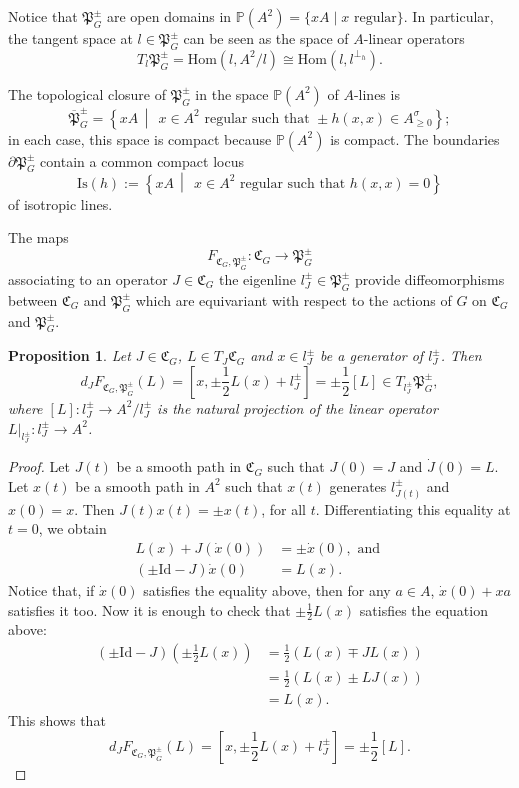 \documentclass[oneside,11pt]{amsart}
\newtheorem{prop}[thm]{Proposition}
\theoremstyle{definition}
\theoremstyle{remark}
\newcommand{\midwd}{\,\middle\vert\,}
\numberwithin{thm}{section}
\numberwithin{equation}{section}
\begin{document}
Notice that $\mathfrak{P}_G^\pm$ are open domains in $\mathbb {P}(A^2)=\{xA\mid x\text{ regular}\}$. In particular, the tangent space at $l\in\mathfrak{P}_G^\pm$ can be seen as the space of $A$-linear operators 
$$T_l\mathfrak{P}_G^\pm=\mathrm{Hom}(l,A^2/l)\cong \mathrm{Hom}(l,l^{\perp_h}).$$

The topological closure of $\mathfrak{P}_G^\pm$ in the space $\mathbb {P}(A^2)$ of $A$-lines is
$$\overline{\mathfrak{P}}_G^\pm=\left\{xA\midwd\; x\in A^{2}\text{ regular such that }\pm h(x,x)\in A^\sigma_{\geq 0} \right\};$$
in each case, this space is compact because $\mathbb{P}(A^2)$ is compact. The boundaries $\partial\mathfrak{P}_G^\pm$ contain a common compact locus 
\[\mathrm{Is}( h):=\left\{xA\midwd\; x\in A^{2}\text{ regular such that } h(x,x)=0 \right\}\] 
of isotropic lines.

The maps 
\begin{equation}\label{eq:ort_CP}
    F_{\mathfrak{C}_G,\mathfrak{P}_G^\pm}\colon \mathfrak{C}_G\to\mathfrak{P}_G^\pm    
\end{equation}
associating to an operator $J\in\mathfrak{C}_G$ the eigenline $l_J^\pm\in\mathfrak{P}_G^\pm$ provide diffeomorphisms between $\mathfrak{C}_G$ and $\mathfrak{P}_G^\pm$ which are equivariant with respect to the actions of $G$ on $\mathfrak{C}_G$ and $\mathfrak{P}_G^\pm$.

\begin{prop}
    Let $J\in\mathfrak{C}_G$, $L\in T_J\mathfrak{C}_G$ and $x\in l_J^\pm$ be a generator of $l_J^\pm$. Then 
    $$
    d_JF_{\mathfrak{C}_G,\mathfrak{P}_G^\pm}(L)=[x,\pm\frac{1}{2}L(x)+l_J^\pm]=\pm\frac{1}{2}[L]\in T_{l_J^\pm}\mathfrak{P}_G^\pm,
    $$
    where $[L]\colon l_J^\pm\to A^2/l_J^\pm$ is the natural projection of the linear operator $L|_{l_J^\pm}\colon l_J^\pm\to A^2$.
\end{prop}

\begin{proof}
    Let $J(t)$ be a smooth path in $\mathfrak{C}_G$ such that $J(0)=J$ and $\dot J(0)=L$. Let $x(t)$ be a smooth path in $A^2$ such that $x(t)$ generates $l^\pm_{J(t)}$ and $x(0)=x$. Then $J(t)x(t)=\pm x(t)$, for all $t$. Differentiating this equality at $t=0$, we obtain 
    \begin{align*}
    L(x)+J(\dot x(0)) & =\pm\dot x(0), \text{ and }\\
    (\pm\mathrm{Id}-J)\dot x(0) & =L(x).
    \end{align*}
    Notice that, if $\dot x(0)$ satisfies the equality above, then for any $a\in A$, $\dot x(0)+xa$ satisfies it too. Now it is enough to check that $\pm\frac{1}{2}L(x)$ satisfies the equation above: 
    \begin{align*}
        (\pm\mathrm{Id}-J)\left(\pm\frac{1}{2}L(x)\right)&=\frac{1}{2}(L(x)\mp JL(x))\\
        &=\frac{1}{2}(L(x)\pm LJ(x))\\
        &=L(x).
    \end{align*}
    This shows that 
    $$d_JF_{\mathfrak{C}_G,\mathfrak{P}_G^\pm}(L)=[x,\pm\frac{1}{2}L(x)+l_J^\pm]=\pm\frac{1}{2}[L].$$
\end{proof}
\end{document}
